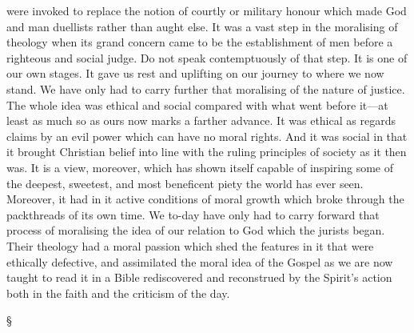 \documentclass[12pt,a5paper,twoside,titlepage]{book}
\begin{document}
were invoked to replace the notion 
of courtly or military honour which made 
God and man duellists rather than aught else. 
It was a vast step in the moralising of theology 
when its grand concern came to be the establishment 
of men before a righteous and social 
judge. Do not speak contemptuously of that 
step. It is one of our own stages. It gave us 
rest and uplifting on our journey to where we 
now stand. We have only had to carry further 
that moralising of the nature of justice. The 
whole idea was ethical and social compared 
with what went before it---at least as much so 
as ours now marks a farther advance. It was 
ethical as regards claims by an evil power which 
can have no moral rights. And it was social 
in that it brought Christian belief into line 
with the ruling principles of society as it then 
was. It is a view, moreover, which has shown 
itself capable of inspiring some of the deepest, 
sweetest, and most beneficent piety the world 
has ever seen. Moreover, it had in it active 
conditions of moral growth which broke 
through the packthreads of its own time. 
We to-day have only had to carry forward 
that process of moralising the idea of our relation 
to God which the jurists began. Their 
theology had a moral passion which shed the 
features in it that were ethically defective, and 
assimilated the moral idea of the Gospel as 
we are now taught to read it in a Bible rediscovered 
and reconstrued by the Spirit's action 
both in the faith and the criticism of the day. 

\begin{center}
\S
\end{center}
\end{document}
